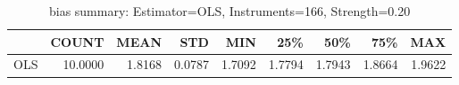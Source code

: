 \begin{table}[ht]
\centering
\caption{bias summary: Estimator=OLS, Instruments=166, Strength=0.20}
\begin{tabular}{lrrrrrrrr}
\toprule
 & COUNT & MEAN & STD & MIN & 25\% & 50\% & 75\% & MAX \\
\midrule
OLS & 10.0000 & 1.8168 & 0.0787 & 1.7092 & 1.7794 & 1.7943 & 1.8664 & 1.9622 \\
\bottomrule
\end{tabular}
\end{table}
